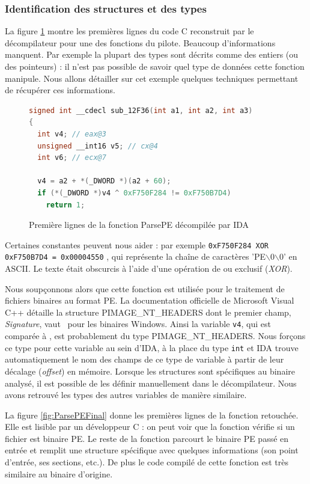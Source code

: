 \subsubsection{Identification des structures et des types}
La figure \ref{fig:ParsePEInitial} montre les premières lignes du code C reconstruit par le décompilateur pour une des fonctions du pilote.
Beaucoup d'informations manquent. Par exemple la plupart des types sont décrits comme des entiers (ou des pointeurs) : il n'est pas possible de savoir quel type de données cette fonction manipule.
Nous allons détailler sur cet exemple quelques techniques permettant de récupérer ces informations.

\begin{figure}[h]
\begin{lstlisting}[language={C}]
signed int __cdecl sub_12F36(int a1, int a2, int a3)
{
  int v4; // eax@3
  unsigned __int16 v5; // cx@4
  int v6; // ecx@7

  v4 = a2 + *(_DWORD *)(a2 + 60);
  if (*(_DWORD *)v4 ^ 0xF750F284 != 0xF750B7D4)
    return 1;
\end{lstlisting}
\caption{Première lignes de la fonction ParsePE décompilée par IDA\label{fig:ParsePEInitial}}
\end{figure}

Certaines constantes peuvent nous aider : par exemple \texttt{0xF750F284 XOR 0xF750B7D4 = 0x00004550} , qui représente la chaîne de caractères 'PE$\backslash$0$\backslash$0' en ASCII. Le texte était obscurcis à l'aide d'une opération de ou exclusif (\emph{XOR}).

Nous soupçonnons alors que cette fonction est utilisée pour le traitement de fichiers binaires au format PE.
La documentation officielle de Microsoft Visual C++ détaille la structure PIMAGE\_NT\_HEADERS dont le premier champ, \emph{Signature}, vaut \PEzz\ pour les binaires Windows.
Ainsi la variable \texttt{v4}, qui est comparée à \PEzz, est probablement du type PIMAGE\_NT\_HEADERS.
Nous forçons ce type pour cette variable au sein d'IDA, à la place du type \texttt{int} et IDA trouve automatiquement le nom des champs de ce type de variable à partir de leur décalage (\emph{offset}) en mémoire.
Lorsque les structures sont spécifiques au binaire analysé, il est possible de les définir manuellement dans le décompilateur.
Nous avons retrouvé les types des autres variables de manière similaire.

La figure \ref{fig:ParsePEFinal} donne les premières lignes de la fonction retouchée.
Elle est lisible par un développeur C : on peut voir que la fonction vérifie si un fichier est binaire PE.
Le reste de la fonction parcourt le binaire PE passé en entrée et remplit une structure spécifique avec quelques informations (son point d'entrée, ses sections, etc.).
De plus le code compilé de cette fonction est très similaire au binaire d'origine.


